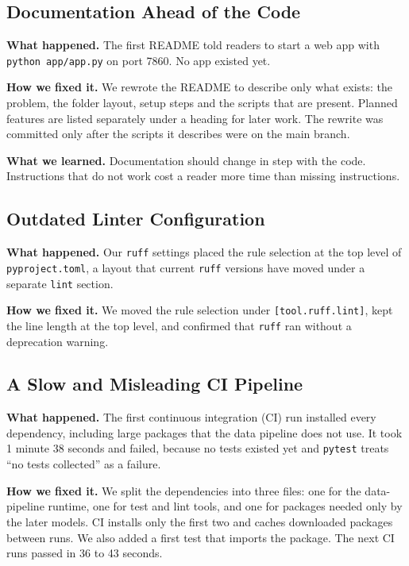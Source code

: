 \subsection{Documentation Ahead of the Code}

\textbf{What happened.} The first README told readers to start a web app with \texttt{python app/app.py} on port 7860. No app existed yet.

\textbf{How we fixed it.} We rewrote the README to describe only what exists: the problem, the folder layout, setup steps and the scripts that are present. Planned features are listed separately under a heading for later work. The rewrite was committed only after the scripts it describes were on the main branch.

\textbf{What we learned.} Documentation should change in step with the code. Instructions that do not work cost a reader more time than missing instructions.

\subsection{Outdated Linter Configuration}

\textbf{What happened.} Our \texttt{ruff} settings placed the rule selection at the top level of \texttt{pyproject.toml}, a layout that current \texttt{ruff} versions have moved under a separate \texttt{lint} section.

\textbf{How we fixed it.} We moved the rule selection under \texttt{[tool.ruff.lint]}, kept the line length at the top level, and confirmed that \texttt{ruff} ran without a deprecation warning.

\subsection{A Slow and Misleading CI Pipeline}

\textbf{What happened.} The first continuous integration (CI) run installed every dependency, including large packages that the data pipeline does not use. It took 1 minute 38 seconds and failed, because no tests existed yet and \texttt{pytest} treats ``no tests collected'' as a failure.

\textbf{How we fixed it.} We split the dependencies into three files: one for the data-pipeline runtime, one for test and lint tools, and one for packages needed only by the later models. CI installs only the first two and caches downloaded packages between runs. We also added a first test that imports the package. The next CI runs passed in 36 to 43 seconds.


